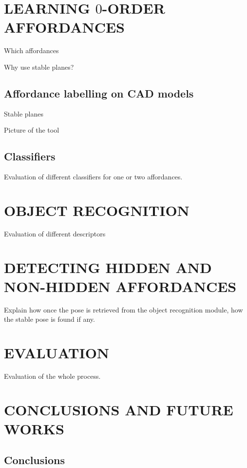 \documentclass[a4paper, 10pt, conference]{ieeeconf}      %
\begin{document}
\section{LEARNING $0$-ORDER AFFORDANCES}

Which affordances

Why use stable planes?

\subsection{Affordance labelling on CAD models}

Stable planes

Picture of the tool

\subsection{Classifiers}

Evaluation of different classifiers for one or two affordances.

\section{OBJECT RECOGNITION}

Evaluation of different descriptors

\section{DETECTING HIDDEN AND NON-HIDDEN AFFORDANCES}

Explain how once the pose is retrieved from the object recognition module,
how the stable pose is found if any.

\section{EVALUATION}

Evaluation of the whole process.

\section{CONCLUSIONS AND FUTURE WORKS}

\subsection{Conclusions}
\end{document}
